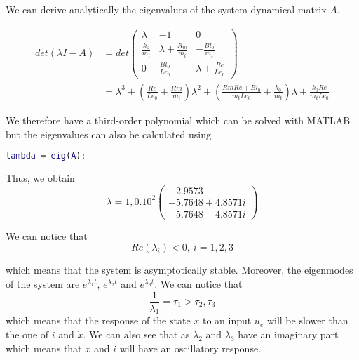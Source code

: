 We can derive analytically the eigenvalues of the system dynamical matrix $A$.

\begin{align}
	\label{eq:eigenValues}
	det(\lambda I-A) & =det\begin{pmatrix}
 \lambda & -1 & 0 \\
  \frac{k_0}{m_t} & \lambda+\frac{R_m}{m_t} & -\frac{Bl_0}{m_t} \\
  0 & \frac{Bl_0}{Le_0} & \lambda+\frac{Re}{Le_0}
\end{pmatrix} \\
& = \lambda^3 +\left(\frac{Re}{Le_0}+\frac{Rm}{m_t}\right)\lambda^2+\left(\frac{RmRe+Bl_0}{m_tLe_0}+\frac{k_0}{m_t}\right)\lambda+\frac{k_0Re}{m_tLe_0}
\end{align}

We therefore have a third-order polynomial which can be solved with MATLAB but the eigenvalues can also be calculated using
\begin{lstlisting}[language=Matlab]
lambda = eig(A);
\end{lstlisting}

Thus, we obtain
\begin{equation}
	\label{eq:eigenValuesValues}
	\lambda = 1,0.10^2\begin{pmatrix}
	-2.9573 \\
	-5.7648 + 4.8571i\\
	-5.7648 - 4.8571i
	\end{pmatrix}
\end{equation}

We can notice that
\begin{equation}
	\label{eq:eigenValuesRe}
	Re(\lambda_i)<0, \ i=1,2,3
\end{equation}

which means that the system is asymptotically stable. Moreover, the eigenmodes of the system are $e^{\lambda_1t}$, $e^{\lambda_2t}$ and $e^{\lambda_3t}$. We can notice that \begin{equation*}
\frac{1}{\lambda_1}=\tau_1>\tau_2, \tau_3
\end{equation*}
which means that the response of the state $x$ to an input $u_e$ will be slower than the one of $i$ and $\dot{x}$. We can also see that as $\lambda_2$ and $\lambda_3$ have an imaginary part which means that $\dot{x}$ and $i$ will have an oscillatory response.
